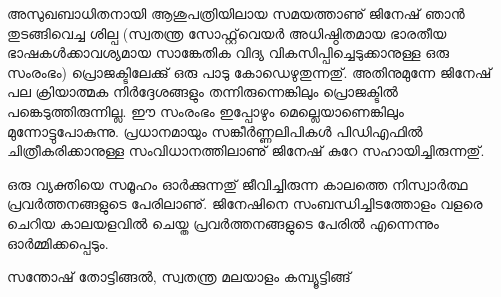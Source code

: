 അസുഖബാധിതനായി ആശുപത്രിയിലായ സമയത്താണു് ജിനേഷ് ഞാന്‍ തുടങ്ങിവെച്ച ശില്പ (സ്വതന്ത്ര സോഫ്റ്റ്‌വെയര്‍ അധിഷ്ഠിതമായ ഭാരതീയ ഭാഷകള്‍ക്കാവശ്യമായ സാങ്കേതിക വിദ്യ വികസിപ്പിച്ചെടുക്കാനുള്ള ഒരു സംരംഭം) പ്രൊജക്ടിലേക്കു് ഒരു പാടു കോഡെഴുതുന്നതു്. അതിനുമുന്നേ ജിനേഷ് പല ക്രിയാത്മക നിര്‍ദ്ദേശങ്ങളും തന്നിരുന്നെങ്കിലും പ്രൊജക്ടില്‍ പങ്കെടുത്തിരുന്നില്ല. ഈ സംരംഭം ഇപ്പോഴും മെല്ലെയാണെങ്കിലും മുന്നോട്ടുപോകുന്നു. പ്രധാനമായും സങ്കീര്‍ണ്ണലിപികള്‍ പിഡിഎഫില്‍ ചിത്രീകരിക്കാനുള്ള സംവിധാനത്തിലാണു് ജിനേഷ് കുറേ സഹായിച്ചിരുന്നതു്.
 
ഒരു വ്യക്തിയെ സമൂഹം ഓര്‍ക്കുന്നതു് ജീവിച്ചിരുന്ന കാലത്തെ നിസ്വാര്‍ത്ഥ പ്രവര്‍ത്തനങ്ങളുടെ പേരിലാണു്. ജിനേഷിനെ സംബന്ധിച്ചിടത്തോളം വളരെ ചെറിയ കാലയളവില്‍ ചെയ്ത പ്രവര്‍ത്തനങ്ങളുടെ പേരില്‍ എന്നെന്നും ഓര്‍മ്മിക്കപ്പെടും.

\begin{flushright}സന്തോഷ് തോട്ടിങ്ങല്‍, സ്വതന്ത്ര മലയാളം കമ്പ്യൂട്ടിങ്ങ്\end{flushright}
\newpage
